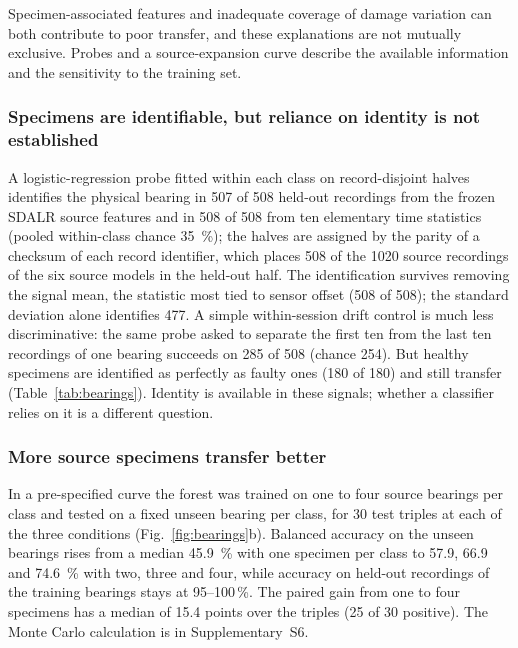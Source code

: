 Specimen-associated features and inadequate coverage of damage variation can both contribute to poor transfer, and these explanations are not mutually exclusive. Probes and a source-expansion curve describe the available information and the sensitivity to the training set.

\subsubsection{Specimens are identifiable, but reliance on identity is not established}

A logistic-regression probe fitted within each
class on record-disjoint halves identifies the physical bearing in 507 of 508 held-out recordings from the frozen SDALR source
features and in 508 of 508 from ten elementary time statistics (pooled within-class chance \SI{35}{\percent}); the halves are assigned by the parity of a checksum of each record
identifier, which places 508 of the 1020 source recordings of the six source models in the held-out half. The identification survives removing the signal mean, the statistic
most tied to sensor offset (508 of 508); the standard deviation alone identifies 477. A simple within-session drift control is much less discriminative: the
same probe asked to separate the first ten from the last ten recordings of one bearing succeeds on 285 of 508 (chance 254).
But healthy specimens are identified as perfectly as faulty ones (180 of 180) and still transfer (Table~\ref{tab:bearings}).
Identity is available in these signals; whether a classifier relies on it is a different question.

\subsubsection{More source specimens transfer better}

In a pre-specified curve the forest was trained on one to four source
bearings per class and tested on a fixed unseen bearing per class, for 30 test triples at each of the three conditions
(Fig.~\ref{fig:bearings}b). Balanced accuracy on the unseen bearings rises from a median \SI{45.9}{\percent} with one
specimen per class to 57.9, 66.9 and \SI{74.6}{\percent} with two, three and four, while accuracy on held-out recordings of
the training bearings stays at 95--100\,\%. The paired gain from one to four specimens has a median of 15.4 points over the
triples (25 of 30 positive). The Monte Carlo calculation is in Supplementary~S6.

